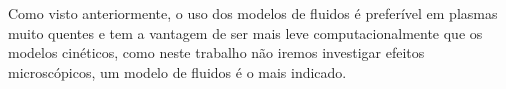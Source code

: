 \documentclass[12pt,oneside,a4paper]{abntex2}
\begin{document}
Como visto anteriormente, o uso dos modelos de fluidos é preferível em plasmas muito quentes e tem a vantagem de ser mais leve computacionalmente que os modelos cinéticos, como neste trabalho não iremos investigar efeitos microscópicos, um modelo de fluidos é o mais indicado. 

\end{document}
